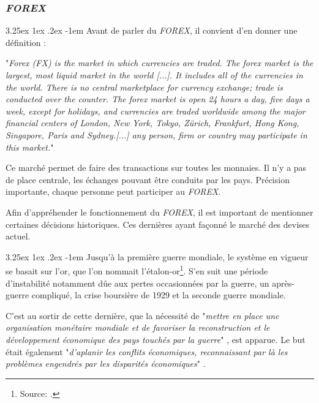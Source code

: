 \documentclass[a4paper, 11pt]{article}
\makeatletter
\renewcommand\paragraph{\@startsection{paragraph}{5}{\z@}%
  {3.25ex \@plus1ex \@minus.2ex}%
  {-1em}%
  {\normalfont\normalsize\bfseries}}
\makeatother
\begin{document}
\subsubsection{\textit{FOREX}}

\paragraph{}
Avant de parler du \textit{FOREX}, il convient d'en donner une définition \cite{forex_definition} :
\begin{center}
	"\textit{Forex (FX) is the market in which currencies are traded. The forex market is the largest, most liquid market in the world [...]. It includes all of the currencies in the world. There is no central marketplace for currency exchange; trade is conducted over the counter. The forex market is open 24 hours a day, five days a week, except for holidays, and currencies are traded worldwide among the major financial centers of London, New York, Tokyo, Zürich, Frankfurt, Hong Kong, Singapore, Paris and Sydney.[...] any person, firm or country may participate in this market.}"
\end{center}
Ce marché permet de faire des transactions sur toutes les monnaies. Il n'y a pas de place centrale, les échanges pouvant être conduits par les pays. Précision importante, chaque personne peut participer au \textit{FOREX}.

Afin d'appréhender le fonctionnement du \textit{FOREX}, il est important de mentionner certaines décisions historiques. Ces dernières ayant façonné le marché des devises actuel.

\paragraph{}
Jusqu'à la première guerre mondiale, le système en vigueur se basait sur l'or, que l'on nommait l'étalon-or\footnote{Source: \cite{etalon_or_a_etalon_dollar}.}. S'en suit une période d'instabilité notamment dûe aux pertes occasionnées par la guerre, un après-guerre compliqué, la crise boursière de 1929 et la seconde guerre mondiale.

C'est au sortir de cette dernière, que la nécessité de "\textit{mettre en place une organisation monétaire mondiale et de favoriser la reconstruction et le
développement économique des pays touchés par la guerre}" \cite{wikipedia_bretten_woods}, est apparue.
Le but était également "\textit{d’aplanir les conflits économiques, reconnaissant par là les problèmes engendrés par les disparités économiques}"
\cite{etalon_or_a_etalon_dollar}.
\end{document}
